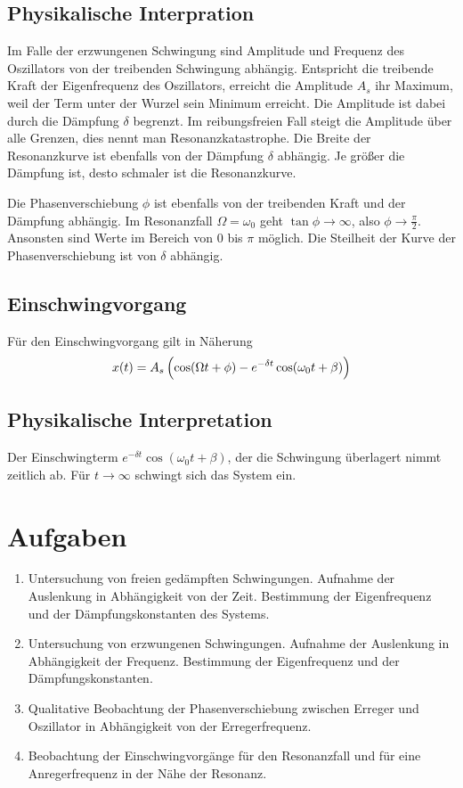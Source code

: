 \documentclass[a4paper,german,12pt,smallheadings]{scrartcl}
\begin{document}
\subsection{Physikalische Interpration}
Im Falle der erzwungenen Schwingung sind Amplitude und Frequenz des Oszillators
von der treibenden Schwingung abhängig. Entspricht die treibende Kraft der
Eigenfrequenz des Oszillators, erreicht die Amplitude $A_s$ ihr Maximum, weil
der Term unter der Wurzel sein Minimum erreicht. Die Amplitude ist dabei durch
die Dämpfung $\delta$ begrenzt. Im reibungsfreien Fall steigt die Amplitude
über alle Grenzen, dies nennt man Resonanzkatastrophe. Die Breite der
Resonanzkurve ist ebenfalls von der Dämpfung $\delta$ abhängig. Je größer die
Dämpfung ist, desto schmaler ist die Resonanzkurve.

Die Phasenverschiebung $\phi$ ist ebenfalls von der treibenden Kraft und der
Dämpfung abhängig. Im Resonanzfall $\Omega = \omega_0$ geht $\tan \phi \to
\infty$, also $\phi \to \frac{\pi}{2}$. Ansonsten sind Werte im Bereich von $0$
bis $\pi$ möglich. Die Steilheit der Kurve der Phasenverschiebung ist von
$\delta$ abhängig.

\subsection{Einschwingvorgang}
Für den Einschwingvorgang gilt in Näherung
\begin{equation}
  x(t) = A_s \del{\cos(\Omega t + \phi) - e^{-\delta t} \cos(\omega_0 t + \beta)}
  \label{eq:ein}
\end{equation}

\subsection{Physikalische Interpretation}
Der Einschwingterm $e^{-\delta t} \cos(\omega_0 t + \beta)$, der die Schwingung
überlagert nimmt zeitlich ab. Für $t \to \infty$ schwingt sich das System ein.

\section{Aufgaben}
\begin{enumerate}[1.]
  \item
    Untersuchung von freien gedämpften Schwingungen. Aufnahme der Auslenkung in
    Abhängigkeit von der Zeit. Bestimmung der Eigenfrequenz und der
    Dämpfungskonstanten des Systems.
  \item
    Untersuchung von erzwungenen Schwingungen. Aufnahme der Auslenkung in
    Abhängigkeit der Frequenz. Bestimmung der Eigenfrequenz und der
    Dämpfungskonstanten.
  \item
    Qualitative Beobachtung der Phasenverschiebung zwischen Erreger und
    Oszillator in Abhängigkeit von der Erregerfrequenz.
  \item
    Beobachtung der Einschwingvorgänge für den Resonanzfall und für eine
    Anregerfrequenz in der Nähe der Resonanz.
\end{enumerate}
\end{document}
